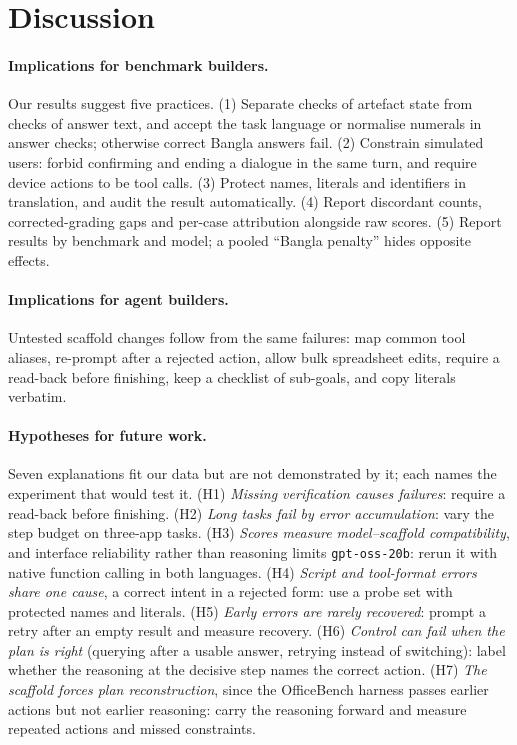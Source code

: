 \documentclass[11pt]{article}
\newcommand{\gptoss}{\texttt{gpt-oss-20b}}
\newcommand{\OB}{OfficeBench}
\begin{document}
\section{Discussion}
\label{sec:discussion}

\paragraph{Implications for benchmark builders.} Our results suggest five practices.
(1) Separate checks of artefact state from checks of answer text, and accept the task language
or normalise numerals in answer checks; otherwise correct Bangla answers fail. (2) Constrain
simulated users: forbid confirming and ending a dialogue in the same turn, and require device
actions to be tool calls. (3) Protect names, literals and identifiers in translation, and audit
the result automatically. (4) Report discordant counts, corrected-grading gaps and per-case
attribution alongside raw scores. (5) Report results by benchmark and model; a pooled ``Bangla
penalty'' hides opposite effects.

\paragraph{Implications for agent builders.} Untested scaffold changes follow from the same
failures: map common tool aliases, re-prompt after a rejected action, allow bulk spreadsheet edits,
require a read-back before finishing, keep a checklist of sub-goals, and copy literals verbatim.

\paragraph{Hypotheses for future work.} Seven explanations fit our data but are not demonstrated
by it; each names the experiment that would test it. (H1) \emph{Missing verification causes
failures}: require a read-back before finishing. (H2) \emph{Long tasks fail by error
accumulation}: vary the step budget on three-app tasks. (H3) \emph{Scores measure model--scaffold
compatibility}, and interface reliability rather than reasoning limits \gptoss{}: rerun it with
native function calling in both languages. (H4) \emph{Script
and tool-format errors share one cause}, a correct intent in a rejected form: use a probe set with
protected names and literals. (H5) \emph{Early errors are rarely recovered}: prompt a retry after an
empty result and measure recovery. (H6) \emph{Control can fail when the plan is right} (querying after a
usable answer, retrying instead of switching): label whether the reasoning at the decisive step
names the correct action. (H7) \emph{The scaffold forces plan reconstruction}, since the \OB{}
harness passes earlier actions but not earlier reasoning: carry the reasoning forward and measure
repeated actions and missed constraints.
\end{document}
